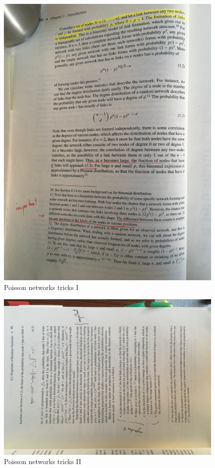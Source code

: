 \documentclass{article}
\begin{document}
\begin{figure}[ht]
    \includegraphics[angle=-90, width=1.2\textwidth]{figures/IMG_1333.jpg}
    \caption{Poisson networks tricks I}
    \label{fig:PropProf}
\end{figure}

\begin{figure}[ht]
    \includegraphics[angle=-90, width=1.2\textwidth]{figures/IMG_1335.jpg}
    \caption{Poisson networks tricks II}
    \label{fig:PropProf}
\end{figure}
\end{document}
